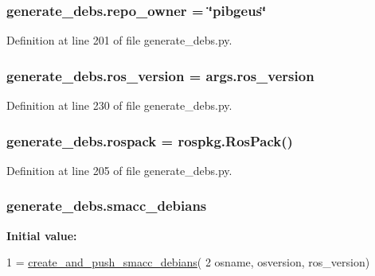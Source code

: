 \subsubsection[{\texorpdfstring{repo\+\_\+owner}{repo_owner}}]{\setlength{\rightskip}{0pt plus 5cm}generate\+\_\+debs.\+repo\+\_\+owner = \char`\"{}pibgeus\char`\"{}}\hypertarget{namespacegenerate__debs_a23479dba5af50c90f3346b04d441ab2b}{}\label{namespacegenerate__debs_a23479dba5af50c90f3346b04d441ab2b}


Definition at line 201 of file generate\+\_\+debs.\+py.

\subsubsection[{\texorpdfstring{ros\+\_\+version}{ros_version}}]{\setlength{\rightskip}{0pt plus 5cm}generate\+\_\+debs.\+ros\+\_\+version = args.\+ros\+\_\+version}\hypertarget{namespacegenerate__debs_af69f35c2a04a4cc8bd6b9805ab436872}{}\label{namespacegenerate__debs_af69f35c2a04a4cc8bd6b9805ab436872}


Definition at line 230 of file generate\+\_\+debs.\+py.

\subsubsection[{\texorpdfstring{rospack}{rospack}}]{\setlength{\rightskip}{0pt plus 5cm}generate\+\_\+debs.\+rospack = rospkg.\+Ros\+Pack()}\hypertarget{namespacegenerate__debs_a609fa33c1ebbff173ec90524eeb7b49d}{}\label{namespacegenerate__debs_a609fa33c1ebbff173ec90524eeb7b49d}


Definition at line 205 of file generate\+\_\+debs.\+py.

\subsubsection[{\texorpdfstring{smacc\+\_\+debians}{smacc_debians}}]{\setlength{\rightskip}{0pt plus 5cm}generate\+\_\+debs.\+smacc\+\_\+debians}\hypertarget{namespacegenerate__debs_a06e0eca4f9d50e67f110b439c402ef44}{}\label{namespacegenerate__debs_a06e0eca4f9d50e67f110b439c402ef44}
{\bfseries Initial value\+:}
\begin{DoxyCode}
1 = \hyperlink{namespacegenerate__debs_af7237c463c8e5b4df369e6befc154c50}{create\_and\_push\_smacc\_debians}(
2         osname, osversion, ros\_version)
\end{DoxyCode}


